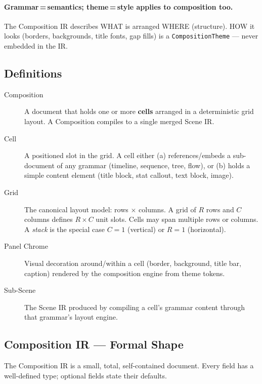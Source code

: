 \paragraph{Grammar\,=\,semantics; theme\,=\,style applies to composition too.}
The Composition IR describes WHAT is arranged WHERE (structure). HOW it looks (borders, backgrounds, title fonts, gap fills) is a \texttt{CompositionTheme} --- never embedded in the IR.

\subsection{Definitions}
\label{sec:composition-defs}

\begin{description}
  \item[Composition] A document that holds one or more \textbf{cells} arranged in a deterministic grid layout.  A Composition compiles to a single merged Scene IR.
  \item[Cell] A positioned slot in the grid.  A cell either (a) references/embeds a sub-document of any grammar (timeline, sequence, tree, flow), or (b) holds a simple content element (title block, stat callout, text block, image).
  \item[Grid] The canonical layout model: rows $\times$ columns.  A grid of $R$ rows and $C$ columns defines $R \times C$ unit slots.  Cells may span multiple rows or columns.  A \emph{stack} is the special case $C=1$ (vertical) or $R=1$ (horizontal).
  \item[Panel Chrome] Visual decoration around/within a cell (border, background, title bar, caption) rendered by the composition engine from theme tokens.
  \item[Sub-Scene] The Scene IR produced by compiling a cell's grammar content through that grammar's layout engine.
\end{description}

\subsection{Composition IR --- Formal Shape}
\label{sec:composition-ir}

The Composition IR is a small, total, self-contained document.  Every field has a well-defined type; optional fields state their defaults.

